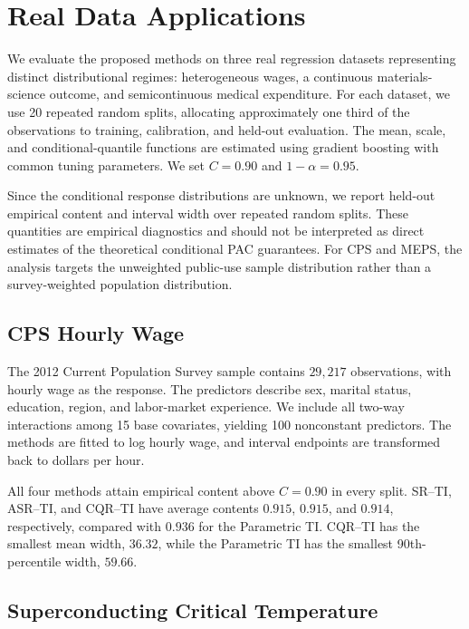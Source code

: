 
\section{Real Data Applications}
\label{sec:real-data}

We evaluate the proposed methods on three real regression datasets representing
distinct distributional regimes: heterogeneous wages, a continuous
materials-science outcome, and semicontinuous medical expenditure. For each
dataset, we use 20 repeated random splits, allocating approximately one third of
the observations to training, calibration, and held-out evaluation. The mean,
scale, and conditional-quantile functions are estimated using gradient boosting
with common tuning parameters. We set \(C=0.90\) and \(1-\alpha=0.95\).

Since the conditional response distributions are unknown, we report held-out
empirical content and interval width over repeated random splits. These
quantities are empirical diagnostics and should not be interpreted as direct
estimates of the theoretical conditional PAC guarantees. For CPS and MEPS, the
analysis targets the unweighted public-use sample distribution rather than a
survey-weighted population distribution.

\subsection{CPS Hourly Wage}

The 2012 Current Population Survey sample contains \(29{,}217\) observations,
with hourly wage as the response. The predictors describe sex, marital status,
education, region, and labor-market experience. We include all two-way
interactions among 15 base covariates, yielding 100 nonconstant predictors. The
methods are fitted to log hourly wage, and interval endpoints are transformed
back to dollars per hour.

All four methods attain empirical content above \(C=0.90\) in every split.
SR--TI, ASR--TI, and CQR--TI have average contents \(0.915\), \(0.915\), and
\(0.914\), respectively, compared with \(0.936\) for the Parametric TI.
CQR--TI has the smallest mean width, \(36.32\), while the Parametric TI has the
smallest 90th-percentile width, \(59.66\).

\subsection{Superconducting Critical Temperature}

